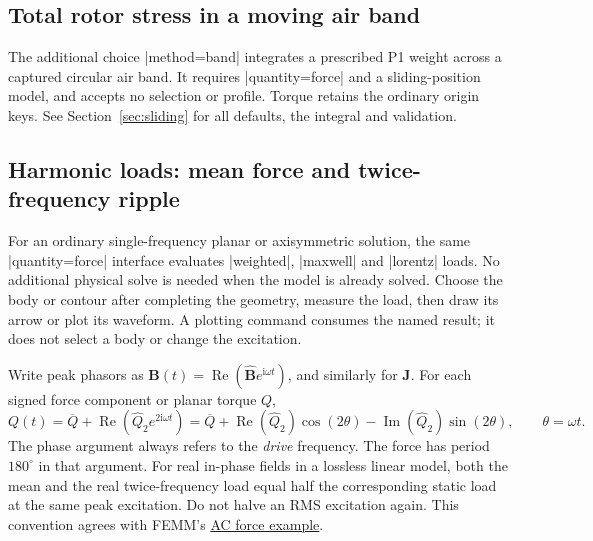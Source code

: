 \subsection{Total rotor stress in a moving air band}
The additional choice |method=band| integrates a prescribed P1 weight across a
captured circular air band. It requires |quantity=force| and a sliding-position
model, and accepts no selection or profile. Torque retains the ordinary origin
keys. See Section~\ref{sec:sliding} for all defaults, the integral and validation.

\subsection{Harmonic loads: mean force and twice-frequency ripple}
\label{sec:harmonic-force}
For an ordinary single-frequency planar or axisymmetric solution, the same
|quantity=force| interface evaluates |weighted|, |maxwell| and |lorentz| loads.
No additional physical solve is needed when the model is already solved.
Choose the body or contour after completing the geometry, measure the load,
then draw its arrow or plot its waveform. A plotting command consumes the named
result; it does not select a body or change the excitation.

Write peak phasors as $\mathbf B(t)=\operatorname{Re}(\widehat{\mathbf B}
 e^{\mathrm i\omega t})$, and similarly for $\mathbf J$. For each signed
force component or planar torque $Q$,
\[
 Q(t)=\overline Q+\operatorname{Re}(\widehat Q_2 e^{2\mathrm i\omega t})
 =\overline Q+\operatorname{Re}(\widehat Q_2)\cos(2\theta)
 -\operatorname{Im}(\widehat Q_2)\sin(2\theta),\qquad\theta=\omega t.
\]
The phase argument always refers to the \emph{drive} frequency. The force has
period $180^\circ$ in that argument. For real in-phase fields in a lossless
linear model, both the mean and the real twice-frequency load equal half the
corresponding static load at the same peak excitation. Do not halve an RMS
excitation again. This convention agrees with FEMM's
\href{https://www.femm.info/doku/doku.php?id=acforceexample}{AC force example}.

